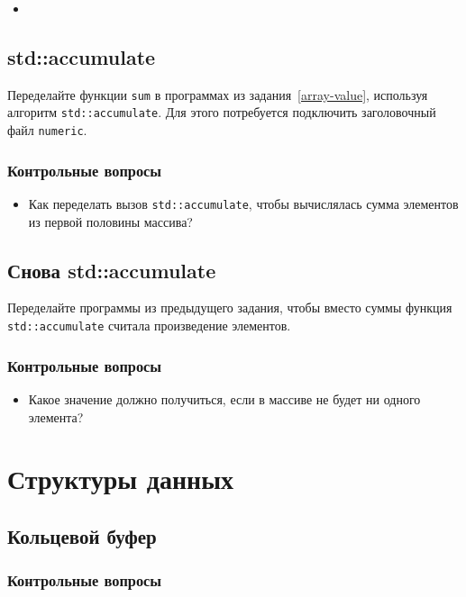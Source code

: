 \documentclass[10pt,twoside,openany]{book}
\begin{document}
\begin{itemize}
    \item
\end{itemize}

\section{std::accumulate}

Переделайте функции {\tt sum} в программах из задания~\ref{array-value},
используя алгоритм {\tt std::accumulate}.
Для этого потребуется подключить заголовочный файл {\tt numeric}.

\subsection*{Контрольные вопросы}

\begin{itemize}
    \item Как переделать вызов {\tt std::accumulate}, чтобы вычислялась сумма элементов
          из первой половины массива?
\end{itemize}

\section{Снова std::accumulate}

Переделайте программы из предыдущего задания, чтобы вместо суммы функция {\tt std::accumulate} считала
произведение элементов.

\subsection*{Контрольные вопросы}

\begin{itemize}
    \item Какое значение должно получиться, если в массиве не будет ни одного элемента?
\end{itemize}

\chapter{Структуры данных}

\section{Кольцевой буфер}

\subsection*{Контрольные вопросы}
\end{document}
